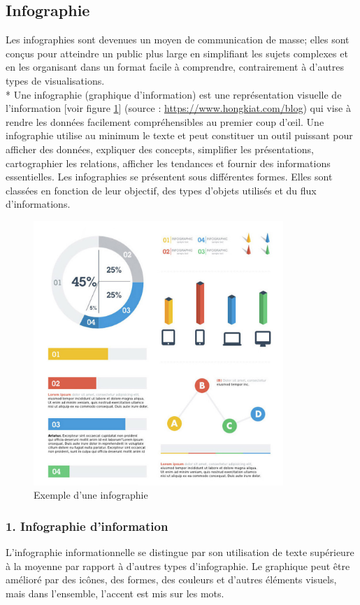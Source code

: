 \documentclass[french, a4paper, 12pt]{report}
\begin{document}
\subsection{Infographie}
Les infographies sont devenues un moyen de communication de masse; elles sont conçus pour atteindre un public plus large en simplifiant les sujets complexes et en les organisant dans un format facile à comprendre, contrairement à d'autres types de visualisations. \\*
Une infographie (graphique d'information) est une représentation visuelle de l'information [voir figure \ref{fig:2.3}] (source : \href{https://www.hongkiat.com/blog/infographic-design-kit/}{https://www.hongkiat.com/blog}) qui vise à rendre les données facilement compréhensibles au premier coup d'œil. Une infographie utilise au minimum le texte et peut constituer un outil puissant pour afficher des données, expliquer des concepts, simplifier les présentations, cartographier les relations, afficher les tendances et fournir des informations essentielles. Les infographies se présentent sous différentes formes. Elles sont classées en fonction de leur objectif, des types d’objets utilisés et du flux d’informations. 
\newpage
\begin{figure}[!ht]
    \centering
    \includegraphics[height=10cm]{images/infographic.jpg}
    \caption{Exemple d'une infographie }
    \label{fig:2.3}
\end{figure}
\subsubsection{1. Infographie d'information}
L'infographie informationnelle se distingue par son utilisation de texte supérieure à la moyenne par rapport à d'autres types d'infographie. Le graphique peut être amélioré par des icônes, des formes, des couleurs et d'autres éléments visuels, mais dans l'ensemble, l'accent est mis sur les mots.
\end{document}

